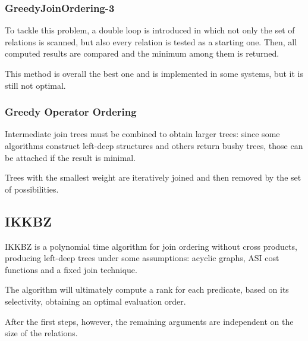 \subsubsection{GreedyJoinOrdering-3}
To tackle this problem, a double loop is introduced in which not only the set of relations is scanned, but also every relation is tested as a starting one. Then, all computed results are compared and the minimum among them is returned. 

This method is overall the best one and is implemented in some systems, but it is still not optimal.

\subsubsection{Greedy Operator Ordering}
Intermediate join trees must be combined to obtain larger trees: since some algorithms construct left-deep structures and others return bushy trees, those can be attached if the result is minimal.

Trees with the smallest weight are iteratively joined and then removed by the set of possibilities. 

\subsection{IKKBZ}
IKKBZ is a polynomial time algorithm for join ordering without cross products, producing left-deep trees under some assumptions: acyclic graphs, ASI cost functions and a fixed join technique.

The algorithm will ultimately compute a rank for each predicate, based on its selectivity, obtaining an optimal evaluation order. 

After the first steps, however, the remaining arguments are independent on the size of the relations.